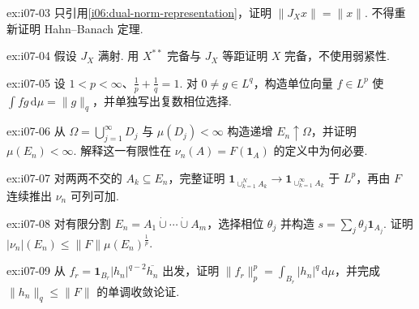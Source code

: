 \begin{FAExercise}{ex:i07-03}
只引用\autoref{i06:dual-norm-representation}，证明 \(\displaystyle \|J_Xx\|=\|x\|\). 不得重新证明 Hahn--Banach 定理.
\end{FAExercise}

\begin{FAExercise}[自反性与完备性]{ex:i07-04}
假设 \(\displaystyle J_X\) 满射. 用 \(\displaystyle X^{**}\) 完备与 \(\displaystyle J_X\) 等距证明 \(\displaystyle X\) 完备，不使用弱紧性.
\end{FAExercise}

\begin{FAExercise}{ex:i07-05}
设 \(\displaystyle 1<p<\infty\)、\(\displaystyle \frac{1}{p}+\frac{1}{q}=1\). 对 \(\displaystyle0\neq g\in L^q\)，构造单位向量 \(\displaystyle f\in L^p\) 使 \(\displaystyle \int fg\,\mathrm{d}\mu=\|g\|_q\)，并单独写出复数相位选择.
\end{FAExercise}

\begin{FAExercise}{ex:i07-06}
从 \(\displaystyle \Omega=\bigcup_{j=1}^{\infty}D_j\) 与 \(\displaystyle \mu(D_j)<\infty\) 构造递增 \(\displaystyle E_n\uparrow\Omega\)，并证明 \(\displaystyle \mu(E_n)<\infty\). 解释这一有限性在 \(\displaystyle \nu_n(A)=F(\mathbf1_A)\) 的定义中为何必要.
\end{FAExercise}

\begin{FAExercise}[局部测度的可列可加性]{ex:i07-07}
对两两不交的 \(\displaystyle A_k\subseteq E_n\)，完整证明 \(\displaystyle \mathbf1_{\cup_{k=1}^NA_k}\to\mathbf1_{\cup_{k=1}^{\infty}A_k}\) 于 \(\displaystyle L^p\)，再由 \(\displaystyle F\) 连续推出 \(\displaystyle \nu_n\) 可列可加.
\end{FAExercise}

\begin{FAExercise}[有限总变差估计]{ex:i07-08}
对有限分割 \(\displaystyle E_n=A_1\dot\cup\cdots\dot\cup A_m\)，选择相位 \(\displaystyle \theta_j\) 并构造 \(\displaystyle s=\sum_j\theta_j\mathbf1_{A_j}\). 证明 \(\displaystyle |\nu_n|(E_n)\leqslant\|F\|\mu(E_n)^{\frac{1}{p}}\).
\end{FAExercise}

\begin{FAExercise}{ex:i07-09}
从 \(\displaystyle f_r=\mathbf1_{B_r}|h_n|^{q-2}\overline{h_n}\) 出发，证明 \(\displaystyle \|f_r\|_p^p=\int_{B_r}|h_n|^q\,\mathrm{d}\mu\)，并完成 \(\displaystyle \|h_n\|_q\leqslant\|F\|\) 的单调收敛论证.
\end{FAExercise}

